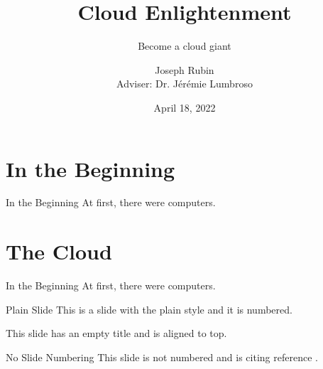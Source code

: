 \documentclass{beamer}
\title{Cloud Enlightenment}
\subtitle{Become a cloud giant}
\author{Joseph Rubin \\ Adviser: Dr. Jérémie Lumbroso}
\institute{Princeton University}
\date{April 18, 2022}
\begin{document}

\begin{frame}
	\maketitle %
\end{frame}


\section{In the Beginning} %


\begin{frame}{In the Beginning}
  At first, there were computers.
\end{frame}


\section{The Cloud}


\begin{frame}{In the Beginning}
  At first, there were computers.
\end{frame}


\begin{frame}[plain]{Plain Slide}
	This is a slide with the plain style and it is numbered.
\end{frame}


\begin{frame}[t]
	This slide has an empty title and is aligned to top.
\end{frame}


\begin{frame}[noframenumbering]{No Slide Numbering}
	This slide is not numbered and is citing reference \cite{knuth74}.
\end{frame}
\end{document}
